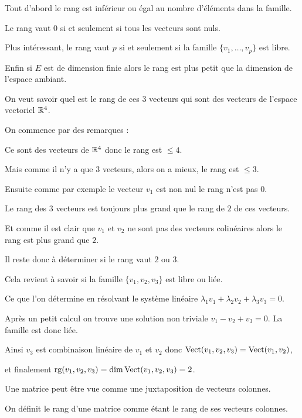 Tout d'abord le rang est inférieur ou égal au nombre d'éléments dans la famille.

Le rang vaut $0$ si et seulement si tous les vecteurs sont nuls.

Plus intéressant, le rang vaut $p$ si et seulement si la famille $\{v_1, \ldots ,v_p\}$ est libre.

\change
Enfin si $E$ est de dimension finie alors le rang est plus petit que la dimension de l'espace ambiant.


\diapo

On veut savoir quel est le rang de ces $3$ vecteurs qui sont des vecteurs de l'espace vectoriel $\mathbb{R}^4$.

\change
On commence par des remarques :

Ce sont des vecteurs de $\mathbb{R}^4$ donc le rang est $\le 4$.

\change
Mais comme il n'y a que $3$ vecteurs, alors on a mieux, le rang est $\le 3$.

\change
Ensuite comme par exemple le vecteur $v_1$ est non nul le rang n'est pas $0$.

\change
Le rang des $3$ vecteurs est toujours plus grand que le rang de $2$ de ces vecteurs.

Et comme il est clair que $v_1$ et $v_2$ ne sont pas des vecteurs colinéaires
alors le rang est plus grand que $2$.


Il reste donc à déterminer si le rang vaut $2$ ou $3$.


\change
Cela revient à savoir si  la famille $\{v_1,v_2,v_3\}$ est libre ou liée.

\change
Ce que l'on détermine en résolvant le système linéaire
$\lambda_1 v_1 + \lambda_2 v_2 + \lambda_3 v_3 = 0$. 

\change
Après un petit calcul on trouve une solution non triviale
$v_1-v_2+v_3=0$. La famille est donc liée.

\change
Ainsi $v_3$ est combinaison linéaire de $v_1$ et $v_2$ donc 
$\mathop{\text{Vect}}\nolimits(v_1,v_2,v_3)= \mathop{\text{Vect}}\nolimits(v_1,v_2)$, 

\change
et finalement $\mathop{\text{rg}}\nolimits (v_1,v_2,v_3) = \dim \mathop{\text{Vect}}\nolimits(v_1,v_2,v_3) = 2$.



\diapo

Une matrice peut être vue comme une juxtaposition de vecteurs colonnes.


On définit le rang d'une matrice comme étant le rang de ses vecteurs colonnes. 

